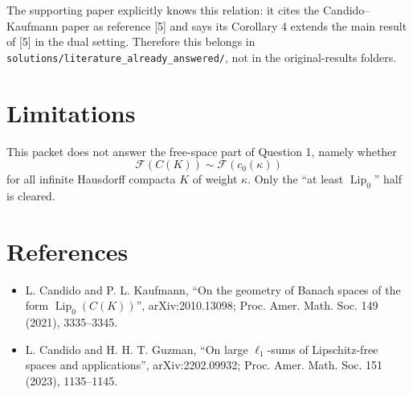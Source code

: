 \documentclass[11pt]{article}
\newcommand{\Lip}{\operatorname{Lip}_0}
\newcommand{\F}{\mathcal{F}}
\begin{document}
The supporting paper explicitly knows this relation: it cites the
Candido--Kaufmann paper as reference [5] and says its Corollary 4 extends the
main result of [5] in the dual setting.  Therefore this belongs in
\texttt{solutions/literature\_already\_answered/}, not in the original-results
folders.

\section*{Limitations}

This packet does not answer the free-space part of Question 1, namely whether
\[
  \F(C(K)) \sim \F(c_0(\kappa))
\]
for all infinite Hausdorff compacta $K$ of weight $\kappa$.  Only the
``at least $\Lip$'' half is cleared.

\section*{References}

\begin{itemize}
\item L. Candido and P. L. Kaufmann, ``On the geometry of Banach spaces of the
form $\Lip(C(K))$'', arXiv:2010.13098; Proc. Amer. Math. Soc. 149 (2021),
3335--3345.
\item L. Candido and H. H. T. Guzman, ``On large $\ell_1$-sums of
Lipschitz-free spaces and applications'', arXiv:2202.09932; Proc. Amer. Math.
Soc. 151 (2023), 1135--1145.
\end{itemize}
\end{document}
